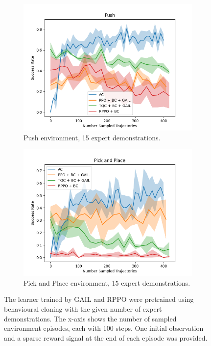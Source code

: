 \begin{figure}[htbp]
\begin{subfigure}[t]{0.45\textwidth}
      \includegraphics[width=\textwidth]{images/FineTuning/Push.png}
      \caption{Push environment, 15 expert demonstrations.}
      \label{fig:plot2}
    \end{subfigure}
    \begin{subfigure}[t]{0.45\textwidth}
      \includegraphics[width=\textwidth]{images/FineTuning/Pick and Place.png}
      \caption{Pick and Place environment, 15 expert demonstrations.}
      \label{fig:plot4}
    \end{subfigure}
    \caption{
    The learner trained by GAIL and RPPO were pretrained using behavioural cloning with the given number of expert demonstrations. 
    The x-axis shows the number of sampled environment episodes, each with 100 steps.  One initial observation and a sparse reward signal at the end of each episode was provided.}
    \label{fig:finetuning}
\end{figure}

